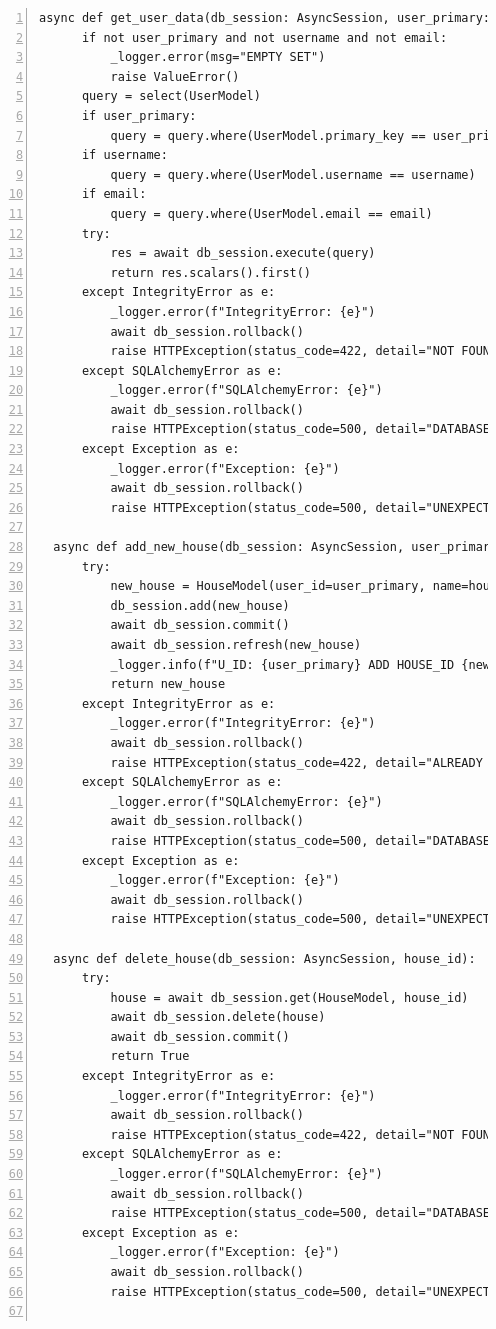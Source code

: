 \documentclass[12pt, letterpaper]{article}
\begin{document}
\begin{lstlisting}[frame=single, style=py, numbers=left, label={lst:dbqueries}, caption={db: queries.py}]
  async def get_user_data(db_session: AsyncSession, user_primary: int = None, username: str = None, email: str = None):
      if not user_primary and not username and not email:
          _logger.error(msg="EMPTY SET")
          raise ValueError()
      query = select(UserModel)
      if user_primary:
          query = query.where(UserModel.primary_key == user_primary)
      if username:
          query = query.where(UserModel.username == username)
      if email:
          query = query.where(UserModel.email == email)
      try:
          res = await db_session.execute(query)
          return res.scalars().first()
      except IntegrityError as e:
          _logger.error(f"IntegrityError: {e}")
          await db_session.rollback()
          raise HTTPException(status_code=422, detail="NOT FOUND")
      except SQLAlchemyError as e:
          _logger.error(f"SQLAlchemyError: {e}")
          await db_session.rollback()
          raise HTTPException(status_code=500, detail="DATABASE ERROR")
      except Exception as e:
          _logger.error(f"Exception: {e}")
          await db_session.rollback()
          raise HTTPException(status_code=500, detail="UNEXPECTED DATABASE ERROR")
  
  async def add_new_house(db_session: AsyncSession, user_primary: int, house_name: str):
      try:
          new_house = HouseModel(user_id=user_primary, name=house_name)
          db_session.add(new_house)
          await db_session.commit()
          await db_session.refresh(new_house)
          _logger.info(f"U_ID: {user_primary} ADD HOUSE_ID {new_house.primary_key}")
          return new_house
      except IntegrityError as e:
          _logger.error(f"IntegrityError: {e}")
          await db_session.rollback()
          raise HTTPException(status_code=422, detail="ALREADY EXISTS")
      except SQLAlchemyError as e:
          _logger.error(f"SQLAlchemyError: {e}")
          await db_session.rollback()
          raise HTTPException(status_code=500, detail="DATABASE ERROR")
      except Exception as e:
          _logger.error(f"Exception: {e}")
          await db_session.rollback()
          raise HTTPException(status_code=500, detail="UNEXPECTED DATABASE ERROR")
  
  async def delete_house(db_session: AsyncSession, house_id):
      try:
          house = await db_session.get(HouseModel, house_id)
          await db_session.delete(house)
          await db_session.commit()
          return True
      except IntegrityError as e:
          _logger.error(f"IntegrityError: {e}")
          await db_session.rollback()
          raise HTTPException(status_code=422, detail="NOT FOUND")
      except SQLAlchemyError as e:
          _logger.error(f"SQLAlchemyError: {e}")
          await db_session.rollback()
          raise HTTPException(status_code=500, detail="DATABASE ERROR")
      except Exception as e:
          _logger.error(f"Exception: {e}")
          await db_session.rollback()
          raise HTTPException(status_code=500, detail="UNEXPECTED DATABASE ERROR")
  

\end{lstlisting}
\end{document}
